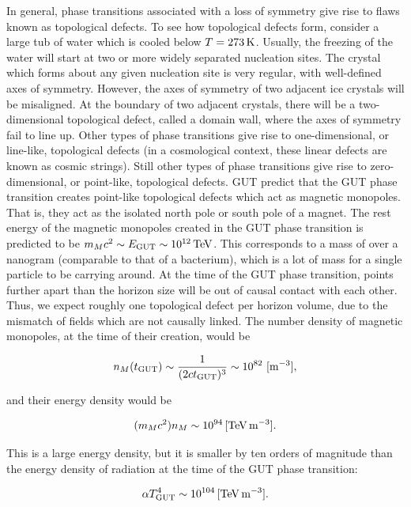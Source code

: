 \documentclass[a4paper,11pt]{article}
\begin{document}
{\noindent}In general, phase transitions associated with a loss of symmetry give rise to flaws known as topological defects. To see how topological defects form, consider a large tub of water which is cooled below $T=273\,{\rm K}$. Usually, the freezing of the water will start at two or more widely separated nucleation sites. The crystal which forms about any given nucleation site is very regular, with well-defined axes of symmetry. However, the axes of symmetry of two adjacent ice crystals will be misaligned. At the boundary of two adjacent crystals, there will be a two-dimensional topological defect, called a domain wall, where the axes of symmetry fail to line up. Other types of phase transitions give rise to one-dimensional, or line-like, topological defects (in a cosmological context, these linear defects are known as cosmic strings). Still other types of phase transitions give rise to zero-dimensional, or point-like, topological defects. GUT predict that the GUT phase transition creates point-like topological defects which act as magnetic monopoles. That is, they act as the isolated north pole or south pole of a magnet. The rest energy of the magnetic monopoles created in the GUT phase transition is predicted to be $m_Mc^2\sim E_\mathrm{GUT}\sim10^{12}\,{\rm TeV}$. This corresponds to a mass of over a nanogram (comparable to that of a bacterium), which is a lot of mass for a single particle to be carrying around. At the time of the GUT phase transition, points further apart than the horizon size will be out of causal contact with each other. Thus, we expect roughly one topological defect per horizon volume, due to the mismatch of fields which are not causally linked. The number density of magnetic monopoles, at the time of their creation, would be

\begin{align*}
    n_M(t_\mathrm{GUT}) \sim \frac{1}{(2ct_\mathrm{GUT})^3} \sim 10^{82} ~ [{\rm m^{-3}}],
\end{align*}

{\noindent}and their energy density would be

\begin{align*}
    (m_Mc^2)n_M \sim 10^{94}\,{[\rm TeV\,m^{-3}]}.
\end{align*}

{\noindent}This is a large energy density, but it is smaller by ten orders of magnitude than the energy density of radiation at the time of the GUT phase transition:

\begin{align*}
    \alpha T_\mathrm{GUT}^4 \sim 10^{104}\,{[\rm TeV\,m^{-3}]}.
\end{align*}
\end{document}
